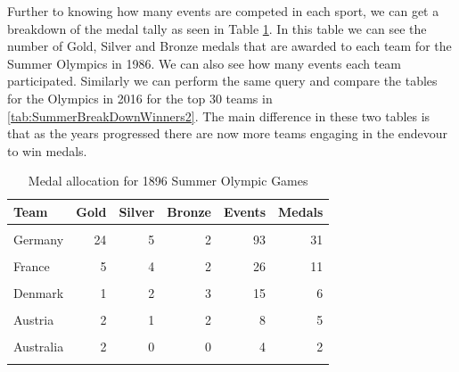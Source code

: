 \documentclass[
]{article}
\begin{document}
\newpage

Further to knowing how many events are competed in each sport, we can get a breakdown of the medal tally as seen in Table \ref{tab:SummerBreakDownWinners1}. In this table we can see the number of Gold, Silver and Bronze medals that are awarded to each team for the Summer Olympics in 1986. We can also see how many events each team participated. Similarly we can perform the same query and compare the tables for the Olympics in 2016 for the top 30 teams in \ref{tab:SummerBreakDownWinners2}. The main difference in these two tables is that as the years progressed there are now more teams engaging in the endevour to win medals.

\begin{table}[H]
\centering
\caption{\label{tab:SummerBreakDownWinners1}Medal allocation for 1896 Summer Olympic Games}
\centering
\fontsize{7}{9}\selectfont
\begin{tabular}[t]{lrrrrr}
\toprule
Team & Gold & Silver & Bronze & Events & Medals\\
\midrule
\cellcolor{gray!10}{Greece} & \cellcolor{gray!10}{10} & \cellcolor{gray!10}{16} & \cellcolor{gray!10}{18} & \cellcolor{gray!10}{140} & \cellcolor{gray!10}{44}\\
Germany & 24 & 5 & 2 & 93 & 31\\
\cellcolor{gray!10}{United States} & \cellcolor{gray!10}{11} & \cellcolor{gray!10}{7} & \cellcolor{gray!10}{2} & \cellcolor{gray!10}{27} & \cellcolor{gray!10}{20}\\
France & 5 & 4 & 2 & 26 & 11\\
\cellcolor{gray!10}{Great Britain} & \cellcolor{gray!10}{2} & \cellcolor{gray!10}{3} & \cellcolor{gray!10}{2} & \cellcolor{gray!10}{23} & \cellcolor{gray!10}{7}\\
\addlinespace
Denmark & 1 & 2 & 3 & 15 & 6\\
\cellcolor{gray!10}{Hungary} & \cellcolor{gray!10}{2} & \cellcolor{gray!10}{1} & \cellcolor{gray!10}{3} & \cellcolor{gray!10}{18} & \cellcolor{gray!10}{6}\\
Austria & 2 & 1 & 2 & 8 & 5\\
\cellcolor{gray!10}{Switzerland} & \cellcolor{gray!10}{1} & \cellcolor{gray!10}{2} & \cellcolor{gray!10}{0} & \cellcolor{gray!10}{8} & \cellcolor{gray!10}{3}\\
Australia & 2 & 0 & 0 & 4 & 2\\
\addlinespace
\cellcolor{gray!10}{Australia/Great Britain} & \cellcolor{gray!10}{0} & \cellcolor{gray!10}{0} & \cellcolor{gray!10}{2} & \cellcolor{gray!10}{2} & \cellcolor{gray!10}{2}\\

\end{tabular}
\end{table}
\end{document}
